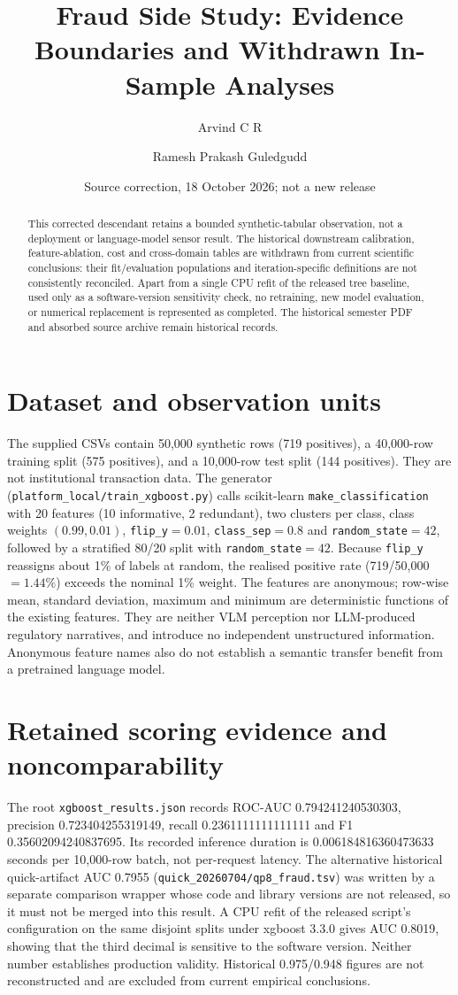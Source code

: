 \documentclass[11pt]{article}
\title{Fraud Side Study: Evidence Boundaries and Withdrawn In-Sample Analyses}
\author{Arvind C R \and Ramesh Prakash Guledgudd}
\date{Source correction, 18 October 2026; not a new release}
\begin{document}
\sloppy
\maketitle
\begin{abstract}
This corrected descendant retains a bounded synthetic-tabular observation,
not a deployment or language-model sensor result. The historical downstream
calibration, feature-ablation, cost and cross-domain tables are withdrawn
from current scientific conclusions: their fit/evaluation populations and
iteration-specific definitions are not consistently reconciled. Apart from a
single CPU refit of the released tree baseline, used only as a
software-version sensitivity check, no retraining, new model evaluation, or
numerical replacement is represented as completed.
The historical semester PDF and absorbed source archive remain historical records.
\end{abstract}
\section{Dataset and observation units}
The supplied CSVs contain 50,000 synthetic rows (719 positives), a
40,000-row training split (575 positives), and a 10,000-row test split
(144 positives). They are not institutional transaction data. The generator
(\texttt{platform\_local/train\_xgboost.py}) calls scikit-learn
\texttt{make\_classification} with 20 features (10 informative, 2 redundant),
two clusters per class, class weights $(0.99, 0.01)$, \texttt{flip\_y}$=0.01$,
\texttt{class\_sep}$=0.8$ and \texttt{random\_state}$=42$, followed by a
stratified 80/20 split with \texttt{random\_state}$=42$. Because
\texttt{flip\_y} reassigns about 1\% of labels at random, the realised positive
rate (719/50,000 $=1.44\%$) exceeds the nominal 1\% weight.
The features are anonymous; row-wise mean, standard deviation, maximum
and minimum are deterministic functions of the existing features. They are
neither VLM perception nor LLM-produced regulatory narratives, and introduce
no independent unstructured information. Anonymous feature names also do
not establish a semantic transfer benefit from a pretrained language model.
\section{Retained scoring evidence and noncomparability}
The root \texttt{xgboost\_results.json} records ROC-AUC
0.794241240530303, precision 0.723404255319149, recall
0.2361111111111111 and F1 0.35602094240837695. Its recorded inference duration
is 0.006184816360473633 seconds per 10,000-row batch, not per-request latency.
The alternative historical quick-artifact AUC 0.7955
(\texttt{quick\_20260704/qp8\_fraud.tsv}) was written by a separate comparison
wrapper whose code and library versions are not released, so it must not be
merged into this result. A CPU refit of the released script's configuration
on the same disjoint splits under xgboost 3.3.0 gives AUC 0.8019, showing that
the third decimal is sensitive to the software version. Neither number
establishes production validity. Historical 0.975/0.948 figures are not
reconstructed and are excluded from current empirical conclusions.
\end{document}
